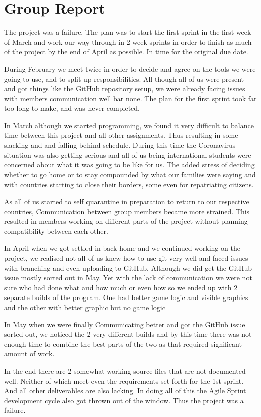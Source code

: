 
\section{Group Report}

The project was a failure. The plan was to start the first sprint
in the first week of March and work our way through in 2 week sprints 
in order to finish as much of the project by the end of April as possible. 
In time for the original due date.

During February we meet twice in order to decide and agree on the
tools we were going to use, and to split up responsibilities. All
though all of us were present and got things like the GitHub
repository setup, we were already facing issues with members 
communication well bar none. The plan for the first sprint took far 
too long to make, and
was never completed.

In March although we started programming, we found it very difficult
to balance time between this project and all other assignments. Thus
resulting in some slacking and and falling behind schedule. During 
this time the Coronavirus situation was also getting serious and all
of us being international students were concerned about what it was 
going to be like for us. The added stress of deciding whether to go 
home or to stay compounded by what our families were saying and with
countries starting to close their borders, some even for 
repatriating citizens.

As all of us started to self quarantine in preparation to return to
our respective countries, Communication between group members became
more strained. This resulted in members working on different parts 
of the project without planning compatibility between each other.

In April when we got settled in back home and we continued working 
on the project, we realised not all of us knew how to use git very
well and faced issues with branching and even uploading to 
GitHub. Although we did get the GitHub issue mostly sorted out in 
May. Yet with the lack of communication we were not sure who had 
done what and how much or even how so we ended up with 2 separate 
builds of the program. One had better game logic and 
visible graphics
and the other with better graphic but no game logic

In May when we were finally Communicating better and got the GitHub 
issue sorted out, we noticed the 2 very different builds and by this
time there was not enough time to combine the best parts of the
two as that required significant amount of work.

In the end there are 2 somewhat working source files that are not
documented well. Neither of which meet even the requirements set 
forth for the 1st sprint. And all other deliverables are also lacking. In doing all of this the Agile Sprint development cycle 
also got thrown out of the window. Thus the project was a failure.